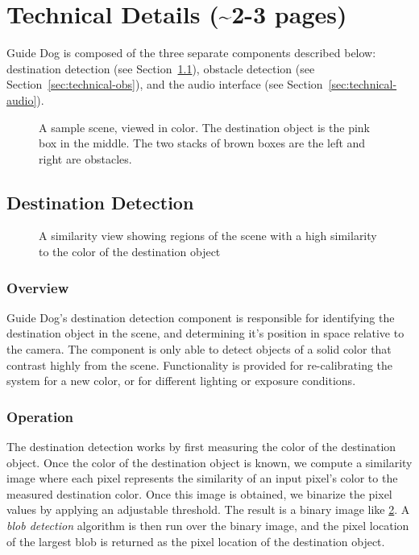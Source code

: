 \section{Technical Details (\textasciitilde 2-3 pages)}
\label{sec:technical}

Guide Dog is composed of the three separate components described below: destination detection
(see Section~\ref{sec:technical-dest}),
obstacle detection (see Section~\ref{sec:technical-obs}), and the audio
interface (see Section~\ref{sec:technical-audio}).

\begin{figure}
\caption{A sample scene, viewed in color. The destination object is the pink box
  in the middle. The two stacks of brown boxes are the left and right are
  obstacles.}
\label{fig:color}
\end{figure}

\subsection{Destination Detection}
\label{sec:technical-dest}

\begin{figure}
\caption{A similarity view showing regions of the scene with a high similarity
to the color of the destination object}
\label{fig:destination}
\end{figure}

\subsubsection{Overview}
\label{sec:technical-dest-overview}

Guide Dog's destination detection component is responsible for identifying the
destination object in the scene, and determining it's position in space 
relative to the camera. The component is only able to detect objects of a solid
color that contrast highly from the scene. Functionality is provided for
re-calibrating the system for a new color, or for different lighting or
exposure conditions. 

\subsubsection{Operation}
\label{sec:technical-dest-op}

The destination detection works by first measuring the color of the destination
object. Once the color of the destination object is known, we compute a
similarity image where each pixel represents the similarity of an input
pixel's color to the measured destination color. Once this image is obtained,
we binarize the pixel values by applying an adjustable threshold. The result
is a binary image like \ref{fig:destination}. A \emph{blob detection}
algorithm is then run over the binary image, and the pixel location of the
largest blob is returned as the pixel location of the destination object.

